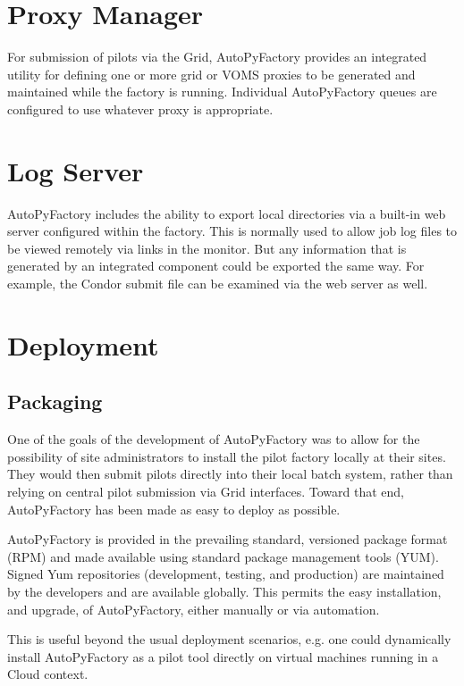 \documentclass[a4paper]{jpconf}
\begin{document}
\section{Proxy Manager}

For submission of pilots via the Grid, AutoPyFactory provides an integrated utility for
defining one or more grid or VOMS proxies to be generated and maintained while
the factory is running. Individual AutoPyFactory queues are configured to use whatever
proxy is appropriate. 


\section{Log Server}

AutoPyFactory includes the ability to export local directories via a built-in web server
configured within the factory. This is normally used to allow job log files to
be viewed remotely via links in the monitor. But any information that is
generated by an integrated component could be exported the same way. For
example, the Condor submit file can be examined via the web server as well. 


\section{Deployment}

\subsection{Packaging}
One of the goals of the development of AutoPyFactory was to allow for the possibility of
site administrators to install the pilot factory locally at their sites. They
would then submit pilots directly into their local batch system, rather than
relying on central pilot submission via Grid interfaces. 
Toward that end, AutoPyFactory has been made as easy to deploy as possible. 

AutoPyFactory is provided in the prevailing standard, versioned package format (RPM) and
made available using standard package management tools (YUM). Signed Yum
repositories (development, testing, and production) are maintained by the
developers and are available globally. This permits the easy installation, and
upgrade, of AutoPyFactory, either manually or via automation. 

This is useful beyond the usual deployment scenarios, e.g. one could dynamically
install AutoPyFactory as a pilot tool directly on virtual machines running in a Cloud
context. 
\end{document}
